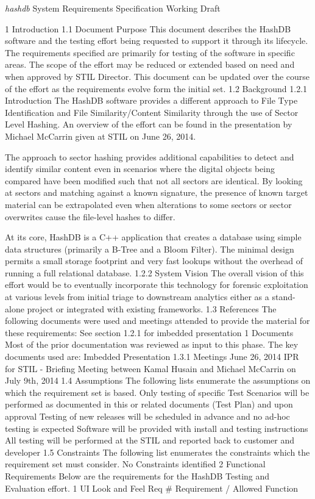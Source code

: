 \documentclass[12pt,twoside]{article}
\newcommand{\hdb}{\emph{hashdb}\xspace}
\begin{document}
\begin{center}
\Large \hdb System Requirements Specification
\large Working Draft
\end{center}


1 Introduction
1.1 Document Purpose
This document describes the HashDB software and the testing effort being requested to support it through its lifecycle.  The requirements specified are primarily for testing of the software in specific areas.  The scope of the effort may be reduced or extended based on need and when approved by STIL Director.
This document can be updated over the course of the effort as the requirements evolve form the initial set.
1.2 Background
1.2.1 Introduction
The HashDB software provides a different approach to File Type Identification and File Similarity/Content Similarity through the use of Sector Level Hashing.  An overview of the effort can be found in the presentation by Michael McCarrin given at STIL on June 26, 2014.   


The approach to sector hashing provides additional capabilities to detect and identify similar content even in scenarios where the digital objects being compared have been modified such that not all sectors are identical.  By looking at sectors and matching against a known signature, the presence of known target material can be extrapolated even when alterations to some sectors or sector overwrites cause the file-level hashes to differ.

At its core, HashDB is a C++ application that creates a database using simple data structures (primarily a B-Tree and a Bloom Filter).  The minimal design permits a small storage footprint and very fast lookups without the overhead of running a full relational database.
1.2.2 System Vision
The overall vision of this effort would be to eventually incorporate this technology for forensic exploitation at various levels from initial triage to downstream analytics either as a stand-alone project or integrated with existing frameworks.
1.3 References
The following documents were used and meetings attended to provide the material for these requirements:
See section 1.2.1 for imbedded presentation
1 Documents
Most of the prior documentation was reviewed as input to this phase.  The key documents used are:
Imbedded Presentation
1.3.1 Meetings
June 26, 2014 IPR for STIL - Briefing
Meeting between Kamal Husain and Michael McCarrin on July 9th, 2014
1.4 Assumptions
The following lists enumerate the assumptions on which the requirement set is based.
Only testing of specific Test Scenarios will be performed as documented in this or related documents (Test Plan) and upon approval
Testing of new releases will be scheduled in advance and no ad-hoc testing is expected
Software will be provided with install and testing instructions
All testing will be performed at the STIL and reported back to customer and developer
1.5 Constraints
The following list enumerates the constraints which the requirement set must consider.
No Constraints identified
2 Functional Requirements
Below are the requirements for the HashDB Testing and Evaluation effort.
1 UI Look and Feel
Req #
Requirement / Allowed Function
\end{document}

